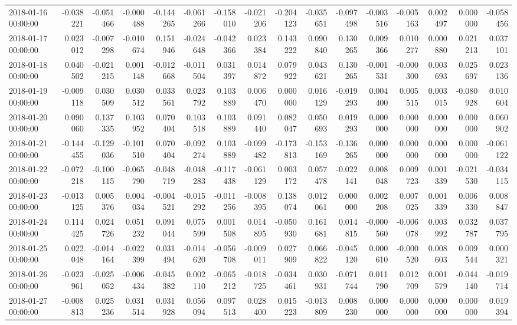 \begin{tabular}{lrrrrrrrrrrrrrrr}
2018-01-16 00:00:00 & -0.038221 & -0.051466 & -0.000488 & -0.144265 & -0.061266 & -0.158010 & -0.021206 & -0.204123 & -0.035651 & -0.097498 & -0.003516 & -0.005163 & 0.002497 & 0.000000 & -0.058456 \\
2018-01-17 00:00:00 & 0.023012 & -0.007298 & -0.010674 & 0.151946 & -0.024648 & -0.042366 & 0.023384 & 0.143222 & 0.090840 & 0.130265 & 0.009366 & 0.010277 & 0.000880 & 0.021213 & 0.037101 \\
2018-01-18 00:00:00 & 0.040502 & -0.021215 & 0.001148 & -0.012668 & -0.011504 & 0.031397 & 0.014872 & 0.079922 & 0.043621 & 0.130265 & -0.001531 & -0.000300 & 0.003693 & 0.025697 & 0.023136 \\
2018-01-19 00:00:00 & -0.009118 & 0.030509 & 0.030512 & 0.033561 & 0.023792 & 0.103889 & 0.006470 & 0.000000 & 0.016129 & -0.019293 & 0.004400 & 0.005515 & 0.003015 & -0.080928 & 0.010604 \\
2018-01-20 00:00:00 & 0.090060 & 0.137335 & 0.103952 & 0.070404 & 0.103518 & 0.103889 & 0.091440 & 0.082047 & 0.050693 & 0.019293 & 0.000000 & 0.000000 & 0.000000 & 0.000000 & 0.060902 \\
2018-01-21 00:00:00 & -0.144455 & -0.129036 & -0.101510 & 0.070404 & -0.092274 & 0.103889 & -0.099482 & -0.173813 & -0.153169 & -0.136265 & 0.000000 & 0.000000 & 0.000000 & 0.000000 & -0.061122 \\
2018-01-22 00:00:00 & -0.072218 & -0.100115 & -0.065790 & -0.048719 & -0.048283 & -0.117438 & -0.061129 & 0.003172 & 0.057478 & -0.022141 & 0.008048 & 0.009723 & 0.001339 & -0.021530 & -0.034115 \\
2018-01-23 00:00:00 & -0.013125 & 0.005376 & 0.004034 & -0.004521 & -0.015292 & -0.011256 & -0.008395 & 0.138074 & 0.012061 & 0.000000 & 0.002208 & 0.007025 & 0.001339 & 0.006330 & 0.008847 \\
2018-01-24 00:00:00 & 0.114425 & 0.024726 & 0.051232 & 0.091044 & 0.075599 & 0.001508 & 0.014895 & -0.050930 & 0.161681 & 0.014815 & -0.000560 & -0.006078 & 0.003992 & 0.032787 & 0.037795 \\
2018-01-25 00:00:00 & 0.022048 & -0.014164 & -0.022399 & 0.031494 & -0.014620 & -0.056708 & -0.009011 & 0.027909 & 0.066822 & -0.045120 & 0.000610 & -0.000520 & 0.008603 & 0.009544 & 0.000321 \\
2018-01-26 00:00:00 & -0.023961 & -0.025052 & -0.006434 & -0.045382 & 0.002110 & -0.065212 & -0.018725 & -0.034461 & 0.030931 & -0.071744 & 0.011790 & 0.012709 & 0.001579 & -0.044140 & -0.019714 \\
2018-01-27 00:00:00 & -0.008813 & 0.025236 & 0.031514 & 0.031928 & 0.056094 & 0.097513 & 0.028400 & 0.015223 & -0.013809 & 0.008230 & 0.000000 & 0.000000 & 0.000000 & 0.000000 & 0.019394 \\

\end{tabular}
